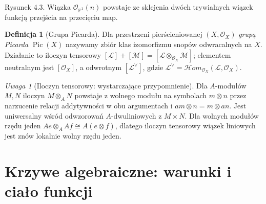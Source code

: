 \documentclass[11pt,a4paper,openany]{report}
\numberwithin{equation}{section}
\theoremstyle{plain}
\theoremstyle{definition}
\newtheorem{definicja}[twierdzenie]{Definicja}
\theoremstyle{remark}
\newtheorem{uwaga}[twierdzenie]{Uwaga}
\newcommand{\A}{\mathbb A}
\newcommand{\PP}{\mathbb P}
\begin{document}
\begin{center}

{\small Rysunek 4.3. Wiązka $\mathcal O_{\PP^1}(n)$ powstaje ze sklejenia dwóch trywialnych wiązek funkcją przejścia na przecięciu map.}\par
\end{center}

\begin{definicja}[Grupa Picarda]
Dla przestrzeni pierścieniowanej $(X,\mathcal O_X)$
\emph{grupą Picarda} $\operatorname{Pic}(X)$
nazywamy zbiór klas izomorfizmu snopów odwracalnych
na $X$. Działanie to iloczyn tensorowy
$[\mathcal L]+[\mathcal M]=[\mathcal L\otimes_{\mathcal O_X}\mathcal M]$;
elementem neutralnym jest $[\mathcal O_X]$, a odwrotnym
$[\mathcal L^\vee]$, gdzie
$\mathcal L^\vee=\mathcal{H}om_{\mathcal O_X}
(\mathcal L,\mathcal O_X)$.
\end{definicja}

\begin{uwaga}[Iloczyn tensorowy: wystarczające przypomnienie]
Dla $A$-modułów $M,N$ iloczyn $M\otimes_A N$ powstaje
z wolnego modułu na symbolach $m\otimes n$ przez
narzucenie relacji addytywności w obu argumentach
i $am\otimes n=m\otimes an$. Jest uniwersalny
wśród odwzorowań $A$-dwuliniowych z $M\times N$.
Dla wolnych modułów rzędu jeden
$Ae\otimes_A Af\cong A(e\otimes f)$, dlatego
iloczyn tensorowy wiązek liniowych jest znów
lokalnie wolny rzędu jeden.
\end{uwaga}

\section{Krzywe algebraiczne: warunki i ciało funkcji}
\label{sec:curves-intro}
\end{document}
